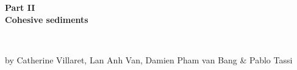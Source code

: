 
\vspace{100.35cm}
\begin{center}
\begin{huge}
{\bf Part II}\\
{\bf Cohesive sediments}
\end{huge}
\\
\begin{normalsize}
by Catherine Villaret, Lan Anh Van, Damien Pham van Bang \& Pablo Tassi
\end{normalsize}
\end{center}
